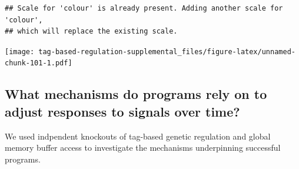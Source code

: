 \documentclass[]{book}
\begin{document}
\begin{verbatim}
## Scale for 'colour' is already present. Adding another scale for 'colour',
## which will replace the existing scale.
\end{verbatim}

\texttt{[image: tag-based-regulation-supplemental\_files/figure-latex/unnamed-chunk-101-1.pdf]}

\hypertarget{what-mechanisms-do-programs-rely-on-to-adjust-responses-to-signals-over-time-2}{%
\subsection{What mechanisms do programs rely on to adjust responses to signals over time?}\label{what-mechanisms-do-programs-rely-on-to-adjust-responses-to-signals-over-time-2}}

We used indpendent knockouts of tag-based genetic regulation and global memory buffer access to investigate the mechanisms underpinning successful programs.
\end{document}
